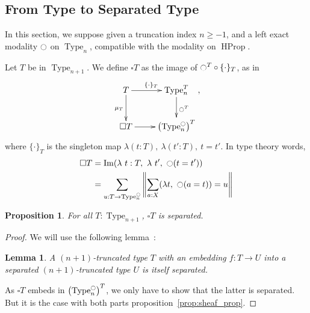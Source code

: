 \documentclass[conference]{IEEEtran}
\newtheorem{prop}[thm]{Proposition}
\newtheorem{lem}[thm]{Lemma}
\DeclareMathOperator{\Type}{Type}
\DeclareMathOperator{\HProp}{HProp}
\DeclareMathOperator{\im}{Im}
\newcommand{\modal}{\ensuremath{\ocircle}}
\begin{document}
\subsection{From Type to Separated Type}
\label{ssec:from-type-separated}
In this section, we suppose given a truncation index $n\geqslant -1$,
and a left exact modality $\modal$ on $\Type_n$, compatible with the
modality on $\HProp$.

Let $T$ be in $\Type_{n+1}$. We define $\square T$ as the image of
$\modal^T \circ \{\cdot\}_T$, as in
$$\xymatrix{
  T \ar[r]^{\{\cdot\}_T} \ar[d]_{\mu_T} & \Type_n^T \ar[d]^{\modal^T} \\
  \square T \ar[r]& \left( \Type_n^\modal \right)^T
}, $$
where $\{\cdot\}_T$ is the singleton map $\lambda (t:T),~\lambda
(t':T),~t=t'$.
In type theory words, 
\begin{align*}
\square T &= \im (\lambda~t:T,~\lambda~ t',~ \modal (t = t')) \\
          &= \sum_{u:T \to \Type_n^\modal} \left\| \sum_{a:X} 
            (\lambda t,~\modal (a=t)) = u\right\|
\end{align*}

\begin{prop}
  For all $T:\Type_{n+1}$, $\square T$ is separated.  
\end{prop}

\begin{proof}
We will use the following lemma~:
\begin{lem}
  A $(n+1)$-truncated type $T$ with an embedding $f : T \to U$
  into a separated $(n+1)$-truncated type $U$ is itself separated.
\end{lem}
As $\square T$ embeds in $\left( \Type_n^\modal \right)^T$, we only
have to show that the latter is separated. But it is the case with
both parts proposition~\ref{prop:sheaf_prop}.
\end{proof}
\end{document}
